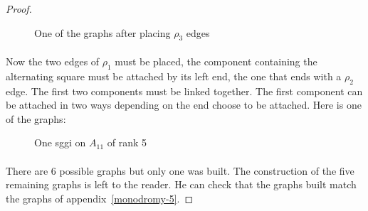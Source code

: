 \begin{proof}
\begin{figure}[H]
\begin{center}
\begin{tikzpicture}[scale=.8]
    \end{tikzpicture}
    \caption{One of the graphs after placing $\rho_3$ edges}
  \end{center}
\end{figure}

\paragraph{}
Now the two edges of $\rho_1$ must be placed, the component containing the alternating square must be attached by its left end, the one that ends with a $\rho_2$ edge. The first two components must be linked together. The first component can be attached in two ways depending on the end choose to be attached. Here is one of the graphs:

\begin{figure}[H]
  \begin{center}
    \caption{One sggi on $A_{11}$ of rank 5}
  \end{center}
\end{figure}

\paragraph{}
There are 6 possible graphs but only one was built. The construction of the five remaining graphs is left to the reader. He can check that the graphs built match the graphs of appendix~\ref{monodromy-5}.

\end{proof}


